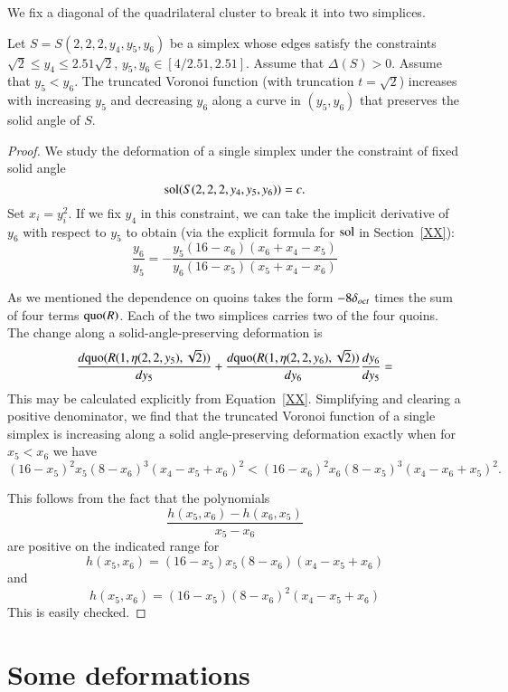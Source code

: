We fix a diagonal of the quadrilateral cluster to break it into
two simplices.

\begin{lemma}
Let $S=S(2,2,2,y_4,y_5,y_6)$ be a simplex whose
edges satisfy the constraints $\sqrt2\le y_4\le 2.51\sqrt2$,
$y_5,y_6\in [4/2.51,2.51]$.  
Assume that $\Delta(S)>0$.  Assume that $y_5 < y_6$.  The
truncated Voronoi function (with truncation $t=\sqrt2$) increases
with increasing $y_5$ and decreasing $y_6$ along a curve in
$(y_5,y_6)$ that preserves the solid angle of $S$.
\end{lemma}



\begin{proof}
We study the deformation of a single simplex under the constraint
of fixed solid angle
    $$\operatorname{sol}(S(2,2,2,y_4,y_5,y_6)) = c.$$
Set $x_i = y_i^2$.  If we fix $y_4$ in this constraint, we can
take the implicit derivative of $y_6$ with respect to $y_5$ to
obtain (via the explicit formula for $\operatorname{sol}$ in Section~\ref{XX}):
    $$
    \frac{y_6}{y_5} = -\frac{y_5 (16- x_6)(x_6 + x_4 - x_5 )}
    {y_6 (16-x_5)(x_5+x_4 - x_6)}
    $$

As we mentioned the dependence on quoins takes the form $-8\delta_{oct}$
times the sum of four terms $\operatorname{quo}(R)$.  Each of the two simplices
carries two of the four quoins.  The change along a
solid-angle-preserving deformation  is
    $$
    \frac{d {\operatorname{quo}}(R(1,\eta(2,2,y_5),\sqrt2))}{d y_5} + \frac{d
    {\operatorname{quo}}(R(1,\eta(2,2,y_6),\sqrt2))} {d y_6} \frac{d y_6}{d y_5} =
    $$
This may be calculated explicitly from Equation~\ref{XX}.
Simplifying and clearing a positive denominator, we find that the
truncated Voronoi function of a single simplex is increasing along
a solid angle-preserving deformation exactly when for $x_5 < x_6$
we have
    $$
    (16-x_5)^2 x_5 (8-x_6)^3 (x_4 - x_5 + x_6)^2 <
    (16-x_6)^2 x_6 (8-x_5)^3 (x_4 - x_6 + x_5)^2.
    $$

This follows from the fact that the polynomials
    $$
    \frac{h(x_5,x_6) - h(x_6,x_5)}{x_5 - x_6}
    $$
are positive on the indicated range for
    $$
    h(x_5,x_6) = (16-x_5) x_5 (8-x_6) (x_4 - x_5 + x_6)
    $$
and
    $$
    h(x_5,x_6) = (16-x_5) (8-x_6)^2 (x_4 - x_5 + x_6)
    $$
This is easily checked.
\end{proof}



\section{Some deformations} %

